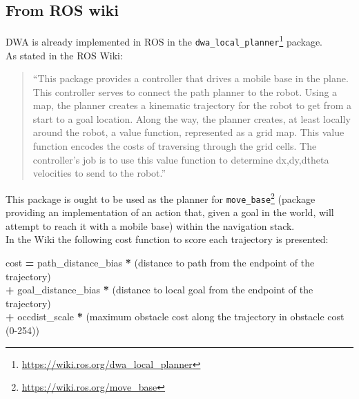 \documentclass[11pt,a4paper]{article}
\begin{document}

\subsection{From ROS wiki}

DWA is already implemented in ROS in the \texttt{dwa\_local\_planner}\footnote{\href{https://wiki.ros.org/dwa\_local\_planner}{https://wiki.ros.org/dwa\_local\_planner}} package.\\

As stated in the ROS Wiki:
\begin{quote}
 ``This package provides a controller that drives a mobile base in the plane. This controller serves to connect the path planner to the robot. Using a map, the planner creates a kinematic trajectory for the robot to get from a start to a goal location. Along the way, the planner creates, at least locally around the robot, a value function, represented as a grid map. This value function encodes the costs of traversing through the grid cells. The controller's job is to use this value function to determine dx,dy,dtheta velocities to send to the robot.''
\end{quote}

This package is ought to be used as the planner for \texttt{move\_base}\footnote{\href{https://wiki.ros.org/move\_base}{https://wiki.ros.org/move\_base}} (package providing an implementation of an action that, given a goal in the world,
will attempt to reach it with a mobile base) within the navigation stack.\\

In the Wiki the following cost function to score each trajectory is presented:

\begin{tcolorbox}[enhanced,width=6in,center,size=fbox]

cost \textbf{=} path\_distance\_bias \textbf{*} (distance to path from the endpoint of the trajectory)\\
    \hspace*{4em}\textbf{+} goal\_distance\_bias \textbf{*} (distance to local goal from the endpoint of the trajectory)\\
    \hspace*{4em}\textbf{+} occdist\_scale \textbf{*} (maximum obstacle cost along the trajectory in obstacle cost (0-254))

\end{tcolorbox}
\end{document}
